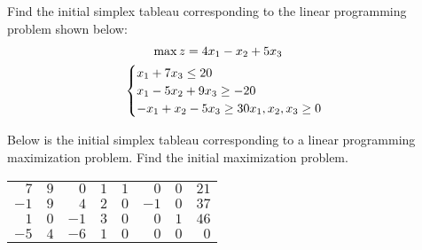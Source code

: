 \documentclass[11pt,letterpaper]{article}
\begin{document}

 Find the initial simplex tableau corresponding to the linear programming problem shown below:
	\[
	\begin{gathered}
	\hspace{-0.7cm} \max z= 4x_1 - x_2 + 5x_3 \\
	\begin{cases}
	x_1 + 7x_3 \leq 20 \\
	x_1 - 5x_2 + 9x_3 \geq -20 \\
	-x_1 + x_2 - 5x_3 \geq30
	x_1, x_2, x_3 \geq 0
	\end{cases}
	\end{gathered}
	\] \pspace

\sol 



\newpage



 Below is the initial simplex tableau corresponding to a linear programming maximization problem. Find the initial maximization problem. \par
	\begin{table}[H]
	\centering
	\begin{tabular}{rrrrrrrr}
	$7$ & $9$ & $0$ & $1$ & $1$ & $0$ & $0$ & $21$ \\
	$-1$ & $9$ & $4$ & $2$ & $0$ & $-1$ & $0$ & $37$ \\
	$1$ & $0$ & $-1$ & $3$ & $0$ & $0$ & $1$ & $46$ \\
	$-5$ & $4$ & $-6$ & $1$ & $0$ & $0$ & $0$ & $0$ \\
	\end{tabular}
	\end{table} \pspace

\sol 



\newpage
\end{document}
